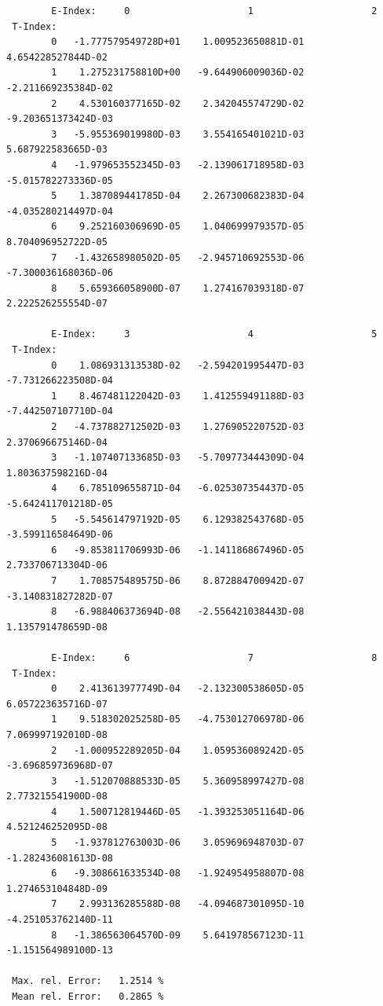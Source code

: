 \documentclass[12pt,dvips]{article}
\begin{document}
\begin{small}\begin{verbatim}
        E-Index:     0                     1                     2
 T-Index:
        0   -1.777579549728D+01    1.009523650881D-01    4.654228527844D-02
        1    1.275231758810D+00   -9.644906009036D-02   -2.211669235384D-02
        2    4.530160377165D-02    2.342045574729D-02   -9.203651373424D-03
        3   -5.955369019980D-03    3.554165401021D-03    5.687922583665D-03
        4   -1.979653552345D-03   -2.139061718958D-03   -5.015782273336D-05
        5    1.387089441785D-04    2.267300682383D-04   -4.035280214497D-04
        6    9.252160306969D-05    1.040699979357D-05    8.704096952722D-05
        7   -1.432658980502D-05   -2.945710692553D-06   -7.300036168036D-06
        8    5.659366058900D-07    1.274167039318D-07    2.222526255554D-07

        E-Index:     3                     4                     5
 T-Index:
        0    1.086931313538D-02   -2.594201995447D-03   -7.731266223508D-04
        1    8.467481122042D-03    1.412559491188D-03   -7.442507107710D-04
        2   -4.737882712502D-03    1.276905220752D-03    2.370696675146D-04
        3   -1.107407133685D-03   -5.709773444309D-04    1.803637598216D-04
        4    6.785109655871D-04   -6.025307354437D-05   -5.642411701218D-05
        5   -5.545614797192D-05    6.129382543768D-05   -3.599116584649D-06
        6   -9.853811706993D-06   -1.141186867496D-05    2.733706713304D-06
        7    1.708575489575D-06    8.872884700942D-07   -3.140831827282D-07
        8   -6.988406373694D-08   -2.556421038443D-08    1.135791478659D-08

        E-Index:     6                     7                     8
 T-Index:
        0    2.413613977749D-04   -2.132300538605D-05    6.057223635716D-07
        1    9.518302025258D-05   -4.753012706978D-06    7.069997192010D-08
        2   -1.000952289205D-04    1.059536089242D-05   -3.696859736968D-07
        3   -1.512070888533D-05    5.360958997427D-08    2.773215541900D-08
        4    1.500712819446D-05   -1.393253051164D-06    4.521246252095D-08
        5   -1.937812763003D-06    3.059696948703D-07   -1.282436081613D-08
        6   -9.308661633534D-08   -1.924954958807D-08    1.274653104848D-09
        7    2.993136285588D-08   -4.094687301095D-10   -4.251053762140D-11
        8   -1.386563064570D-09    5.641978567123D-11   -1.151564989100D-13

 Max. rel. Error:   1.2514 %
 Mean rel. Error:   0.2865 %
\end{verbatim}\end{small}
\end{document}
